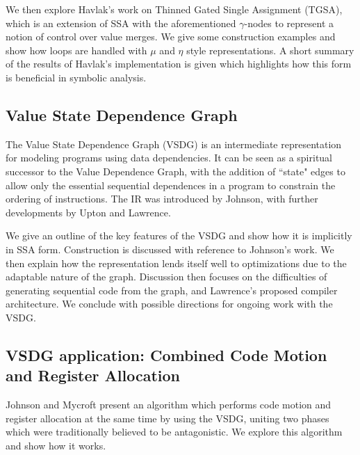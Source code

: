 We then explore Havlak's work\cite{Havlak93constructionof} on Thinned Gated Single Assignment (TGSA), which is an extension of SSA with the aforementioned $\gamma$-nodes to represent a notion of control over value merges. We give some construction examples and show how loops are handled with $\mu$ and $\eta$ style representations. A short summary of the results of Havlak's implementation is given which highlights how this form is beneficial in symbolic analysis.

\subsection*{Value State Dependence Graph}

The Value State Dependence Graph (VSDG) is an intermediate representation for modeling programs using data dependencies. It can be seen as a spiritual successor to the Value Dependence Graph\cite{177907}, with the addition of ``state" edges to allow only the essential sequential dependences in a program to constrain the ordering of instructions. The IR was introduced by Johnson\cite{UCAM-CL-TR-607}, with further developments by Upton\cite{upton} and Lawrence\cite{UCAM-CL-TR-705}.

We give an outline of the key features of the VSDG and show how it is implicitly in SSA form. Construction is discussed with reference to Johnson's work. We then explain how the representation lends itself well to optimizations due to the adaptable nature of the graph. Discussion then focuses on the difficulties of generating sequential code from the graph\cite{DBLP:conf/pdpta/Upton03}, and Lawrence's proposed compiler architecture. We conclude with possible directions for ongoing work with the VSDG.

\subsection*{VSDG application: Combined Code Motion and Register Allocation}

Johnson and Mycroft \cite{johnson-combined} present an algorithm which performs code motion and register allocation at the same time by using the VSDG, uniting two phases which were traditionally believed to be antagonistic. We explore this algorithm and show how it works.
